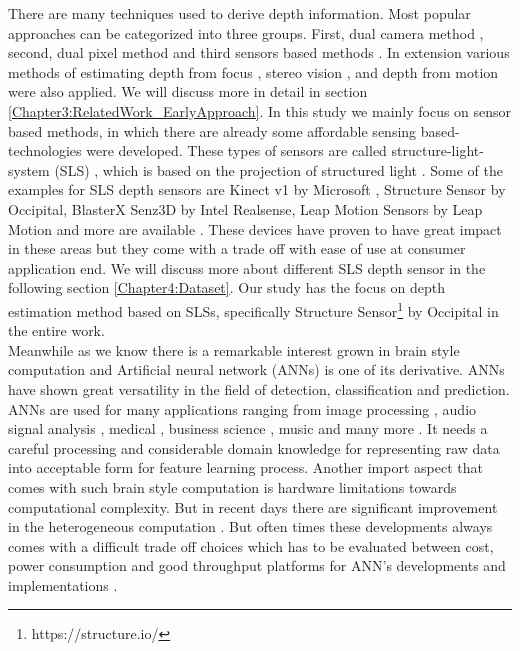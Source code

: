 There are many techniques used to derive depth information. Most popular approaches can be categorized into three groups. First, dual camera method \cite{li2009dual}, second, dual pixel method \cite{martinello2015dual, choi2017all} and third sensors based methods \cite{salvi2004pattern}. In extension various methods of estimating depth from focus \cite{grossmann1987depth}, stereo vision \cite{bulthoff1988integration}, and depth from motion \cite{ullman1979interpretation} were also applied. We will discuss more in detail in section \ref{Chapter3:RelatedWork_EarlyApproach}. In this study we mainly focus on sensor based methods, in which there are already some affordable sensing based-technologies were developed. These types of sensors are called structure-light-system (SLS) \cite{salvi2004pattern}, which is based on the projection of structured light \cite{zhang2012microsoft}. Some of the examples for SLS depth sensors are Kinect v1 by Microsoft , Structure Sensor by Occipital, BlasterX Senz3D by Intel Realsense, Leap Motion Sensors by Leap Motion \cite{marin2014hand} and more are available \cite{mal2018sparse}. These devices have proven to have great impact in these areas but they come with a trade off with ease of use at consumer application end. We will discuss more about different SLS depth sensor in the following section \ref{Chapter4:Dataset}. Our study has the focus on depth estimation method based on SLSs, specifically Structure Sensor\footnote{https://structure.io/} by Occipital in the entire work.\\

Meanwhile as we know there is a remarkable interest grown in brain style computation and Artificial neural network (ANNs) is one of its derivative. ANNs have shown great versatility in the field of detection, classification and prediction. ANNs are used for many applications ranging from image processing \cite{guyon1991applications} , audio signal analysis \cite{bourlard1993continuous}, medical \cite{baxt1990use}, business science \cite{widrow1994neural}, music \cite{nadar2019towards} and many more \cite{zhang2000neural}. It  needs a careful processing and considerable domain knowledge for representing raw data into acceptable form for feature learning process. Another import aspect that comes with such brain style computation is hardware limitations towards computational complexity. But in recent days there are significant improvement in the heterogeneous computation \cite{mittal2015survey}. But often times these developments always comes with a difficult trade off choices which has to be evaluated between cost, power consumption and good throughput platforms for ANN's developments and implementations \cite{mittal2019survey}. \\





